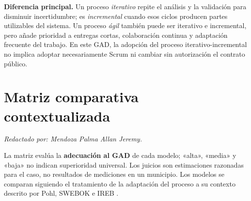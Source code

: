 \documentclass[conference,onecolumn]{IEEEtran}
\begin{document}
\noindent\textbf{Diferencia principal.} Un proceso \emph{iterativo} repite el análisis y la validación para disminuir incertidumbre; es \emph{incremental} cuando esos ciclos producen partes utilizables del sistema. Un proceso \emph{ágil} también puede ser iterativo e incremental, pero añade prioridad a entregas cortas, colaboración continua y adaptación frecuente del trabajo. En este GAD, la adopción del proceso iterativo-incremental no implica adoptar necesariamente Scrum ni cambiar sin autorización el contrato público.

\section{Matriz comparativa contextualizada}
\noindent\textit{Redactado por: Mendoza Palma Allan Jeremy.}\par\smallskip

La matriz evalúa la \textbf{adecuación al GAD} de cada modelo; «alta», «media» y «baja» no indican superioridad universal. Los juicios son estimaciones razonadas para el caso, no resultados de mediciones en un municipio. Los modelos se comparan siguiendo el tratamiento de la adaptación del proceso a su contexto descrito por Pohl, SWEBOK e IREB \cite{pohl2025,washizaki2024,buhne2026}.
\end{document}
